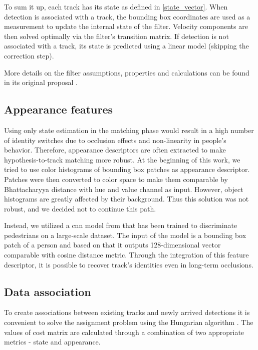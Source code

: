         To sum it up, each track has its state as defined in \ref{state_vector}. When detection is associated with a track, the bounding box coordinates are used as a measurement to update the internal state of the filter. Velocity components are then solved optimally via the filter's transition matrix. If detection is not associated with a track, its state is predicted using a linear model (skipping the correction step). 
        
        More details on the filter assumptions, properties and calculations can be found in its original proposal \cite{kalman1960new}.

    \subsection{Appearance features}\label{appearance_features}
        Using only state estimation in the matching phase would result in a high number of identity switches due to occlusion effects and non-linearity in people's behavior. Therefore, appearance descriptors are often extracted to make hypothesis-to-track matching more robust. At the beginning of this work, we tried to use color histograms of bounding box patches as appearance descriptor. Patches were then converted to  color space to make them comparable by Bhattacharyya distance with hue and value channel as input. However, object histograms are greatly affected by their background. Thus this solution was not robust, and we decided not to continue this path.
        
        Instead, we utilized a \gls{cnn} model from \cite{wojke2017simple} that has been trained to discriminate pedestrians on a large-scale dataset. The input of the model is a bounding box patch of a person and based on that it outputs 128-dimensional vector comparable with cosine distance metric. Through the integration of this feature descriptor, it is possible to recover track's identities even in long-term occlusions.

    \subsection{Data association}
        To create associations between existing tracks and newly arrived detections it is convenient to solve the assignment problem using the Hungarian algorithm \cite{jonker1987shortest}. The values of cost matrix are calculated through a combination of two appropriate metrics - state and appearance. 
        
